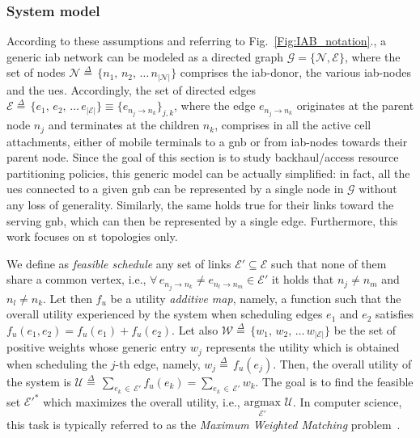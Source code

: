 \subsubsection{System model}
\label{Subsec:sys_model}

According to these assumptions and referring to Fig.~\ref{Fig:IAB_notation}., a generic \gls{iab} network can be modeled as a directed graph $\mathcal{G} = \{\mathcal{N},  \mathcal{E} \}$, where the set of nodes $\mathcal{N} \mathop = \limits^{\Delta} \, \{ n_1, \, n_2, \, \ldots \, n_{\vert \mathcal{N} \vert }  \}$ comprises the \gls{iab}-donor, the various \gls{iab}-nodes and the \glspl{ue}. 
Accordingly, the set of directed edges $\mathcal{E} \mathop = \limits^{\Delta} \, \{ e_{1} , \, e_{2}, \, \ldots \, \allowbreak e_{\vert \mathcal{E} \vert} \} \equiv \{ e_{n_j \to n_k} \}_{j, k} $, where the edge $e_{n_j \to n_k}$ originates at the parent node $n_j$ and terminates at the children $n_k$, comprises in all the active cell attachments, either of mobile terminals to a \gls{gnb} or from \gls{iab}-nodes towards their parent node.
Since the goal of this section is to study backhaul/access resource partitioning policies, this generic model can be actually simplified: in fact, all the \glspl{ue} connected to a given \gls{gnb} can be represented by a single node in $\mathcal{G}$ without any loss of generality. Similarly, the same holds true for their links toward the serving \gls{gnb}, which can then be represented by a single edge. 
Furthermore, this work focuses on \gls{st} topologies only. 

We define as \textit{feasible schedule} any set of links $\mathcal{E'} \subseteq \mathcal{E}$ such that none of them share a common vertex, i.e., $ \forall \, e_{n_j \to n_k} \neq e_{n_l \to n_m} \in \mathcal{E'}$ it holds that $n_{j} \neq n_{m}$ and $n_{l} \neq n_{k}$. Let then $f_u$ be a utility \textit{additive map}, namely, a function such that the overall utility experienced by the system when scheduling edges $e_1$ and $e_2$ satisfies $f_u (e_1, e_2) = f_u (e_1) + f_u(e_2)$. Let also $\mathcal{W} \mathop = \limits^{\Delta} \, \{ w_1, \, w_2, \, \ldots \, w_{\vert \mathcal{E} \vert } \}$ be the set of positive weights whose generic entry $w_j$ represents the utility which is obtained when scheduling the $j$-th edge, namely, $w_j \mathop = \limits^{\Delta} \, f_u (e_j)$. Then, the overall utility of the system is $\mathcal{U} \mathop = \limits^{\Delta} \, \sum_{e_k \, \in \, \mathcal{E'}} f_u(e_k) = \sum_{e_k \, \in \, \mathcal{E'}} w_k $.
The goal is to find the feasible set $\mathcal{E'}^{*}$ which maximizes the overall utility, i.e., $\underset{\mathcal{E'}}{\mathrm{argmax}} \,\, \mathcal{U} $. In computer science, this task is typically referred to as the \textit{Maximum Weighted Matching} problem~\cite{Korte2002}.


